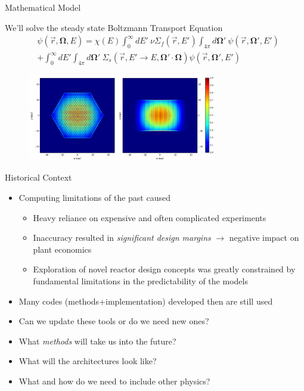 \documentclass[xcolor=x11names]{beamer}
\newcommand{\ve}[1]{\ensuremath{\mathbf{#1}}}
\newcommand{\vOmega}{\ensuremath{\ve{\Omega}}}
\newcommand{\Macro}{\ensuremath{\Sigma}}
\begin{document}
\begin{frame}{Mathematical Model}

We'll solve the steady state Boltzmann Transport Equation
\vspace{-.5em}
\begin{align}
  [\vOmega \cdot \nabla + \Macro(\vec{r}, E)] &\psi(\vec{r}, \vOmega, E)  = \chi(E) \int_0^{\infty} dE' \:\nu \Macro_{f}(\vec{r}, E') \int_{4\pi} d\vOmega' \:\psi(\vec{r}, \vOmega', E')  \nonumber \\
   &+ \int_0^{\infty} dE' \int_{4\pi} d\vOmega' \:\Macro_{s}(\vec{r}, E' \to E, \vOmega' \cdot \vOmega) \psi(\vec{r}, \vOmega', E')  \nonumber
\end{align}
\vspace{-1.5em}
    \begin{figure}
    \includegraphics[height=1.5in,clip]{FissionSourceDistribution}
    \end{figure}

\end{frame}


\begin{frame}{Historical Context}
\begin{itemize}
\item Computing limitations of the past caused
\begin{itemize}
\item Heavy reliance on expensive and often complicated experiments
\item Inaccuracy resulted in \emph{significant design margins} $\rightarrow$ negative impact on plant economics
\item Exploration of novel reactor design concepts was greatly constrained by fundamental limitations in the predictability of the models
\vspace*{1 em}
\end{itemize}
\item Many codes (methods+implementation) developed then are still used 
\pause
\item Can we update these tools or do we need new ones?
\pause
\item What \textit{methods} will take us into the future?
\pause
\item What will the architectures look like?
\pause
\item What and how do we need to include other physics?
\end{itemize}
\end{frame}
\end{document}

